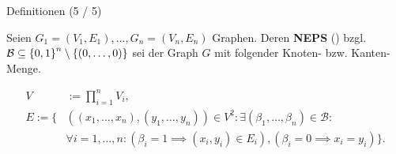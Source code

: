 \documentclass[aspectratio=169]{beamer}
\begin{document}
\begin{frame}{Definitionen (5 / 5)}

  \begin{definition*}[NEPS]

    Seien $G_1 = (V_1, E_1), \dots, G_n = (V_n, E_n)$ Graphen. Deren \textbf{NEPS} () bzgl. $\mathcal B \subseteq {\left \{ 0, 1 \right \}}^n \setminus {\left \{ (0, \dots, 0) \right \}}$ sei der Graph $G$ mit folgender Knoten- bzw. Kanten-Menge.
  
    \begin{align*}
      V & := \prod_{i=1}^n V_i, \\
      E
      :=
      \{ &
        ((x_1, \dots, x_n), (y_1, \dots, y_n)) \in V^2:
        \exists (\beta_1, \dots, \beta_n) \in \mathcal B: \\ &
          \forall i = 1, \dots, n:
            (\beta_i = 1 \implies (x_i, y_i) \in E_i),
            (\beta_i = 0 \implies x_i = y_i)
      \}.
    \end{align*}

  \end{definition*}
  

\end{frame}
\end{document}
